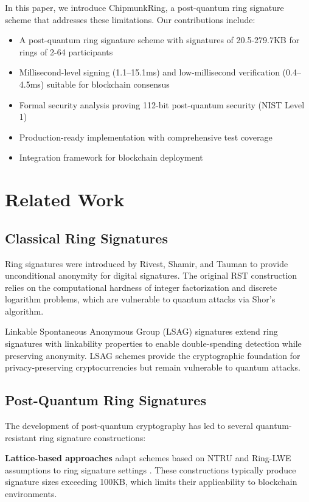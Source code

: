 \documentclass[11pt,a4paper]{article}
\begin{document}
In this paper, we introduce ChipmunkRing, a post-quantum ring signature scheme that addresses these limitations. Our contributions include:

\begin{itemize}
\item A post-quantum ring signature scheme with signatures of 20.5-279.7KB for rings of 2-64 participants
\item Millisecond-level signing (1.1--15.1ms) and low-millisecond verification (0.4--4.5ms) suitable for blockchain consensus
\item Formal security analysis proving 112-bit post-quantum security (NIST Level 1)
\item Production-ready implementation with comprehensive test coverage
\item Integration framework for blockchain deployment
\end{itemize}

\section{Related Work}

\subsection{Classical Ring Signatures}

Ring signatures were introduced by Rivest, Shamir, and Tauman \cite{rst01} to provide unconditional anonymity for digital signatures. The original RST construction relies on the computational hardness of integer factorization and discrete logarithm problems, which are vulnerable to quantum attacks via Shor's algorithm.

Linkable Spontaneous Anonymous Group (LSAG) signatures \cite{lsag04} extend ring signatures with linkability properties to enable double-spending detection while preserving anonymity. LSAG schemes provide the cryptographic foundation for privacy-preserving cryptocurrencies but remain vulnerable to quantum attacks.

\subsection{Post-Quantum Ring Signatures}

The development of post-quantum cryptography has led to several quantum-resistant ring signature constructions:

\textbf{Lattice-based approaches} adapt schemes based on NTRU and Ring-LWE assumptions to ring signature settings \cite{lattice-rings}. These constructions typically produce signature sizes exceeding 100KB, which limits their applicability to blockchain environments.
\end{document}
